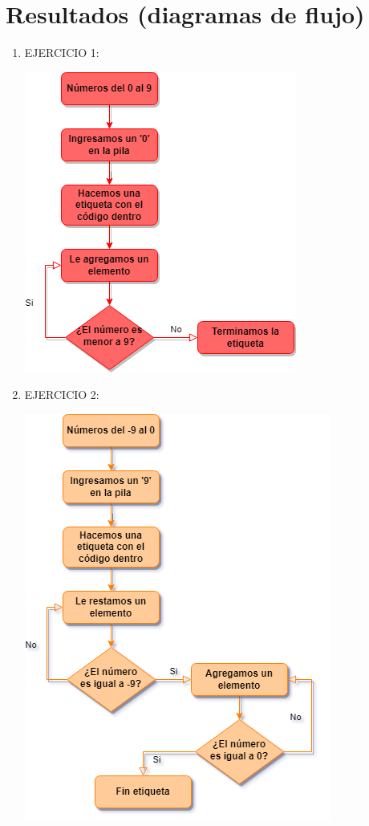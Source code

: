 \documentclass[conference]{IEEEtran}
\begin{document}
\begin{enumerate}
\end{enumerate}
\newpage
\section{Resultados (diagramas de flujo)}
\begin{enumerate}
  	\item EJERCICIO 1:\\
  	\begin{center}
	\includegraphics{diagrama1} 
	\end{center}
\newpage
	\item  EJERCICIO 2:\\
	\begin{center}
	\includegraphics{diagrama2} \\

\end{center}
\end{enumerate}
\end{document}
